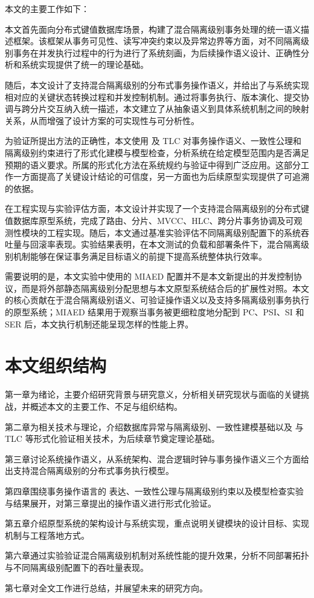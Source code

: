 本文的主要工作如下：

本文首先面向分布式键值数据库场景，构建了混合隔离级别事务处理的统一语义描述框架。该框架从事务可见性、读写冲突约束以及异常边界等方面，对不同隔离级别事务在并发执行过程中的行为进行了系统刻画，为后续操作语义设计、正确性分析和系统实现提供了统一的理论基础。

随后，本文设计了支持混合隔离级别的分布式事务操作语义，并给出了与系统实现相对应的关键状态转换过程和并发控制机制。通过将事务执行、版本演化、提交协调与跨分片交互纳入统一描述，本文建立了从抽象语义到具体系统机制之间的映射关系，从而增强了设计方案的可实现性与可分析性。

为验证所提出方法的正确性，本文使用 \TLAPlus 及 TLC 对事务操作语义、一致性公理和隔离级别约束进行了形式化建模与模型检查，分析系统在给定模型范围内是否满足预期的语义要求。\TLAPlus 所属的形式化方法在系统规约与验证中得到广泛应用\cite{newcombe2015amazon,WangJi2019FormalMethods}。这部分工作一方面提高了关键设计结论的可信度，另一方面也为后续原型实现提供了可追溯的依据。

在工程实现与实验评估方面，本文设计并实现了一个支持混合隔离级别的分布式键值数据库原型系统，完成了路由、分片、MVCC、HLC、跨分片事务协调及可观测性模块的工程实现。随后，本文通过基准实验评估不同隔离级别配置下的系统吞吐量与回滚率表现。实验结果表明，在本文测试的负载和部署条件下，混合隔离级别机制能够在保证事务满足目标语义的前提下提高系统整体执行效率。

需要说明的是，本文实验中使用的 MIAED 配置并不是本文新提出的并发控制协议，而是将外部静态隔离级别分配思想与本文原型系统结合后的扩展性对照。本文的核心贡献在于混合隔离级别语义、可验证操作语义以及支持多隔离级别事务执行的原型系统；MIAED 结果用于观察当事务被更细粒度地分配到 PC、PSI、SI 和 SER 后，本文执行机制还能呈现怎样的性能上界。


\section{本文组织结构}

第一章为绪论，主要介绍研究背景与研究意义，分析相关研究现状与面临的关键挑战，并概述本文的主要工作、不足与组织结构。

第二章为相关技术与理论，介绍数据库异常与隔离级别、一致性建模基础以及 \TLAPlus 与 TLC 等形式化验证相关技术，为后续章节奠定理论基础。

第三章讨论系统操作语义，从系统架构、混合逻辑时钟与事务操作语义三个方面给出支持混合隔离级别的分布式事务执行模型。

第四章围绕事务操作语言的 \TLAPlus 表达、一致性公理与隔离级别约束以及模型检查实验与结果展开，对第三章提出的操作语义进行形式化验证。

第五章介绍原型系统的架构设计与系统实现，重点说明关键模块的设计目标、实现机制与工程落地方式。

第六章通过实验验证混合隔离级别机制对系统性能的提升效果，分析不同部署拓扑与不同隔离级别配置下的吞吐量表现。

第七章对全文工作进行总结，并展望未来的研究方向。
